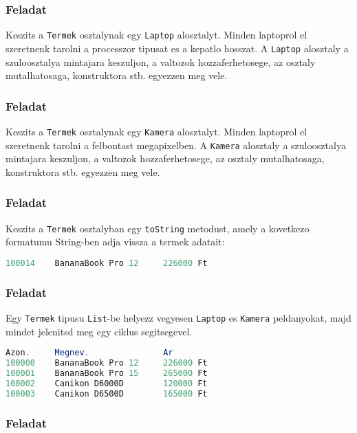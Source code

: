 \documentclass{article}
\let\l\lstinline
\begin{document}
\subsubsection{Feladat}

Keszits a \l{Termek} osztalynak egy \l{Laptop} alosztalyt.
Minden laptoprol el szeretnenk tarolni a processzor tipusat es a kepatlo hosszat.
A \l{Laptop} alosztaly a szuloosztalya mintajara keszuljon, a valtozok hozzaferhetosege, az osztaly mutalhatosaga, konstruktora stb.
egyezzen meg vele.

\subsubsection{Feladat}

Keszits a \l{Termek} osztalynak egy \l{Kamera} alosztalyt.
Minden laptoprol el szeretnenk tarolni a felbontast megapixelben.
A \l{Kamera} alosztaly a szuloosztalya mintajara keszuljon, a valtozok hozzaferhetosege, az osztaly mutalhatosaga, konstruktora stb.
egyezzen meg vele.

\subsubsection{Feladat}

Keszits a \l{Termek} osztalyban egy \l{toString} metodust, amely a kovetkezo formatumu String-ben adja vissza a termek adatait:

\begin{lstlisting}[language=Java, caption=Feladat]
100014    BananaBook Pro 12     226000 Ft
\end{lstlisting}

\subsubsection{Feladat}

Egy \l{Termek} tipusu \l{List}-be helyezz vegyesen \l{Laptop} es \l{Kamera} peldanyokat, majd mindet jelenitsd meg egy ciklus segitsegevel.

\begin{lstlisting}[language=Java, caption=Feladat]
Azon.     Megnev.               Ar
100000    BananaBook Pro 12     226000 Ft
100001    BananaBook Pro 15     265000 Ft
100002    Canikon D6000D        120000 Ft
100003    Canikon D6500D        165000 Ft
\end{lstlisting}

\subsubsection{Feladat}
\end{document}
